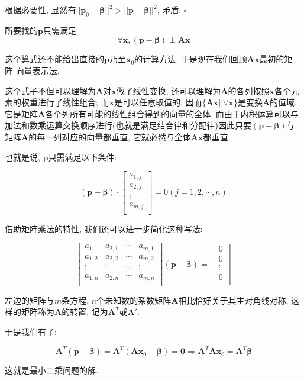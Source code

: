 \documentclass[UTF8]{ctexart}
\begin{document}
\begin{prf}
				根据必要性, 显然有$||\bm{p}_0-\bm{\beta}||^2>||\bm{p}-\bm{\beta}||^2$, 矛盾. $\square$

				所要找的$\bm{p}$只需满足$$\forall\bm{x}, (\bm{p}-\bm{\beta})\perp\bm{A}\bm{x}$$
		
				这个算式还不能给出直接的$\bm{p}$乃至$\bm{x}_0$的计算方法. 于是现在我们回顾$\bm{A}\bm{x}$最初的矩阵-向量表示法. 
				
				这个式子不但可以理解为$\bm{A}$对$\bm{x}$做了线性变换, 还可以理解为$\bm{A}$的各列按照$\bm{x}$各个元素的权重进行了线性组合; 而$\bm{x}$是可以任意取值的, 因而$\{\bm{A}\bm{x}||\forall\bm{x}\}$是变换$\bm{A}$的值域, 它是矩阵$\bm{A}$各个列所有可能的线性组合得到的向量的全体. 而由于内积运算可以与加法和数乘运算交换顺序进行(也就是满足结合律和分配律)因此只要$(\bm{p}-\bm{\beta})$与矩阵$\bm{A}$的每一列对应的向量都垂直, 它就必然与全体$\bm{A}\bm{x}$都垂直. 
				
				也就是说, $\bm{p}$只需满足以下条件: 
				
				$$(\bm{p}-\bm{\beta})\cdot\begin{bmatrix}
				a_{1,j}\\
				a_{2,j}\\
				\vdots\\
				a_{m,j}\\
				\end{bmatrix}=0(j=1,2,\cdots,n)$$
				
				借助矩阵乘法的特性, 我们还可以进一步简化这种写法: 
				
				$$\begin{bmatrix}
				a_{1,1} & a_{2,1} & \cdots & a_{m,1}\\
				a_{1,2} & a_{2,2} & \cdots & a_{m,2}\\
				\vdots & \vdots & \ddots & \vdots\\
				a_{1,n} & a_{2,n} & \cdots & a_{m,n}\\
				\end{bmatrix}(\bm{p}-\bm{\beta})=
				\begin{bmatrix}
				0\\
				0\\
				\vdots\\
				0\\
				\end{bmatrix}$$
				
				左边的矩阵与$m$条方程, $n$个未知数的系数矩阵$\bm{A}$相比恰好关于其主对角线对称, 这样的矩阵称为$\bm{A}$的转置, 记为$\bm{A}^T$或$\bm{A}'$. 
				
				于是我们有了: 
				
				$$\bm{A}^T(\bm{p}-\bm{\beta})=\bm{A}^T(\bm{A}\bm{x}_0-\bm{\beta})=\mathbf{0}\Longrightarrow \bm{A}^T\bm{A}\bm{x}_0=\bm{A}^T\bm{\beta}$$
				
				这就是最小二乘问题的解.
		\end{prf} 
\end{document}
